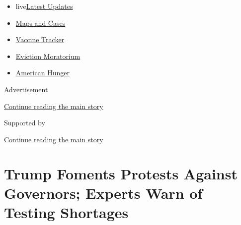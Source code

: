 \begin{itemize}
\tightlist
\item
  live\href{https://www.nytimes3xbfgragh.onion/2020/09/08/world/covid-19-coronavirus.html?name=styln-coronavirus-national\&region=TOP_BANNER\&block=storyline_menu_recirc\&action=click\&pgtype=Article\&impression_id=fddebdb1-f1d6-11ea-8367-83b45a6aab78\&variant=undefined}{Latest
  Updates}
\item
  \href{https://www.nytimes3xbfgragh.onion/interactive/2020/us/coronavirus-us-cases.html?name=styln-coronavirus-national\&region=TOP_BANNER\&block=storyline_menu_recirc\&action=click\&pgtype=Article\&impression_id=fddebdb2-f1d6-11ea-8367-83b45a6aab78\&variant=undefined}{Maps
  and Cases}
\item
  \href{https://www.nytimes3xbfgragh.onion/interactive/2020/science/coronavirus-vaccine-tracker.html?name=styln-coronavirus-national\&region=TOP_BANNER\&block=storyline_menu_recirc\&action=click\&pgtype=Article\&impression_id=fddebdb3-f1d6-11ea-8367-83b45a6aab78\&variant=undefined}{Vaccine
  Tracker}
\item
  \href{https://www.nytimes3xbfgragh.onion/2020/09/02/your-money/eviction-moratorium-covid.html?name=styln-coronavirus-national\&region=TOP_BANNER\&block=storyline_menu_recirc\&action=click\&pgtype=Article\&impression_id=fddee4c0-f1d6-11ea-8367-83b45a6aab78\&variant=undefined}{Eviction
  Moratorium}
\item
  \href{https://www.nytimes3xbfgragh.onion/interactive/2020/09/02/magazine/food-insecurity-hunger-us.html?name=styln-coronavirus-national\&region=TOP_BANNER\&block=storyline_menu_recirc\&action=click\&pgtype=Article\&impression_id=fddee4c1-f1d6-11ea-8367-83b45a6aab78\&variant=undefined}{American
  Hunger}
\end{itemize}

Advertisement

\protect\hyperlink{after-top}{Continue reading the main story}

Supported by

\protect\hyperlink{after-sponsor}{Continue reading the main story}

\hypertarget{trump-foments-protests-against-governors-experts-warn-of-testing-shortages-}{%
\section{Trump Foments Protests Against Governors; Experts Warn of
Testing Shortages
}\label{trump-foments-protests-against-governors-experts-warn-of-testing-shortages-}}

